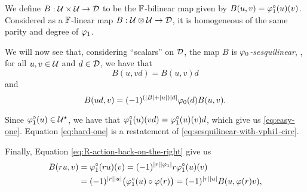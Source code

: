 \documentclass{amsbook}
\begin{document}

We define $B: \mathcal U\times \mathcal U \to \mathcal{D}$ to be the $\mathbb{F}$-bilinear map given by $B(u, v) = \varphi_1^\circ (u)(v)$. 
Considered as a $\mathbb{F}$-linear map $B: \mathcal U\otimes \mathcal U \to \mathcal{D}$, it is homogeneous of the same parity and degree of $\varphi_1$.

We will now see that, considering ``scalars'' on $\mathcal{D}$, the map $B$ is \emph{$\varphi_0$-sesquilinear}, \ie, for all $u,v \in \mathcal U$ and $d\in \mathcal{D}$, we have that
\begin{equation}\label{eq:easy-one}
    B(u,vd) = B(u,v)d
\end{equation}
and
\begin{equation}\label{eq:hard-one}
    B(ud, v) = (-1)^ {(|B| + |u|)|d|}\varphi_0(d) B(u, v).
\end{equation}

Since $\varphi_1^\circ (u) \in \mathcal U^\star$, we have that $\varphi_1^\circ(u)(vd) = \varphi_1^\circ(u)(v)d$, which give us \eqref{eq:easy-one}.
Equation \ref{eq:hard-one} is a restatement of \eqref{eq:sesquilinear-with-vphi1-circ}.

Finally, Equation \eqref{eq:R-action-back-on-the-right} give us
%
\begin{equation*}
    \begin{split}
        B(ru,v) &= \varphi_1^\circ (ru)(v) = (-1)^{|r||\varphi_1|} r \varphi_1^\circ (u)(v)\\ &= (-1)^{|r||u|} \big(\varphi_1^\circ (u) \circ \varphi(r) \big) = (-1)^{|r||u|} B(u,\varphi(r)v),
    \end{split}
\end{equation*}

\begin{prop}
    
\end{prop}



\end{document}
